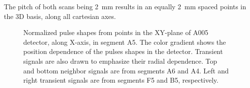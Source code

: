 The pitch of both scans being 2~mm results in an equally 2~mm spaced points in the 3D basis, along all cartesian axes.



\begin{figure}
\centering
{}
\caption{Normalized pulse shapes from points in the XY-plane of A005 detector, along X-axis, in segment A5. The color gradient shows the position dependence of the pulses shapes in the detector. Transient signals are also drawn to emphasize their radial dependence. Top and bottom neighbor signals are from segments A6 and A4. Left and right transient signals are from segments F5 and B5, respectively.}
\label{fig:neighbors_Ycst}
\end{figure}

